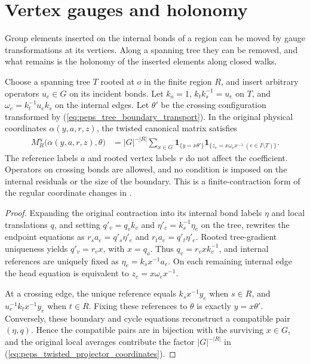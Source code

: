 \section{Vertex gauges and holonomy}%
\label{sec:peps_regular_gauges_holonomy}

Group elements inserted on the internal bonds of a region can be moved by
gauge transformations at its vertices. Along a spanning tree they can be
removed, and what remains is the holonomy of the inserted elements along
closed walks.

\begin{lemma}%
    \label{thm:peps_regular_twisted_projector_coordinates}
    \leanok
    Choose a spanning tree $T$ rooted at $o$ in the finite region $R$,
    and insert arbitrary operators $u_e\in G$ on its incident bonds.
    Let $k_o=1$, $k_tk_s^{-1}=u_e$ on $T$, and
    $\omega_e=k_t^{-1}u_ek_s$ on the internal edges.
    Let $\theta'$ be the crossing configuration transformed by
    (\ref{eq:peps_tree_boundary_transport}). In the original physical
    coordinates $\alpha(y,a,r,z)$, the twisted canonical matrix satisfies
    \begin{align}
        M_R^u\bigl(\alpha(y,a,r,z),\theta\bigr)
         & = |G|^{-|R|}\sum_{x\in G}
        \mathbf 1_{\{y=x\theta'\}}
        \mathbf 1_{\{z_e=x\omega_ex^{-1}\ (e\in I\setminus T)\}}.
        \label{eq:peps_twisted_projector_coordinates}
    \end{align}
    The reference labels $a$ and rooted vertex labels $r$ do not affect
    the coefficient. Operators on crossing bonds are allowed, and no
    condition is imposed on the internal residuals or the size of the
    boundary. This is a finite-contraction form of the regular
    coordinate changes in \cite[\S6.2--6.3]{Schuch2010PEPS}.
\end{lemma}
\begin{proof}\leanok
    Expanding the original contraction into its internal bond labels
    $\eta$ and local translations $q$, and setting
    $q'_v=q_vk_v$ and $\eta'_e=k_s^{-1}\eta_e$ on the tree,
    rewrites the endpoint equations as
    $r_sa_e=q'_s\eta'_e$ and $r_ta_e=q'_t\eta'_e$.
    Rooted tree-gradient uniqueness yields $q'_v=r_vx$, with $x=q_o$.
    Thus $q_v=r_vxk_v^{-1}$, and internal references are uniquely fixed
    as $\eta_e=k_sx^{-1}a_e$. On each remaining internal edge the
    head equation is equivalent to $z_e=x\omega_ex^{-1}$.

    At a crossing edge, the unique reference equals
    $k_sx^{-1}y_e$ when $s\in R$, and
    $u_e^{-1}k_tx^{-1}y_e$ when $t\in R$.
    Fixing these references to $\theta$ is exactly $y=x\theta'$.
    Conversely, these boundary and cycle equations reconstruct a
    compatible pair $(\eta,q)$. Hence the compatible pairs are in
    bijection with the surviving $x\in G$, and the original local
    averages contribute the factor $|G|^{-|R|}$ in
    (\ref{eq:peps_twisted_projector_coordinates}).
\end{proof}

